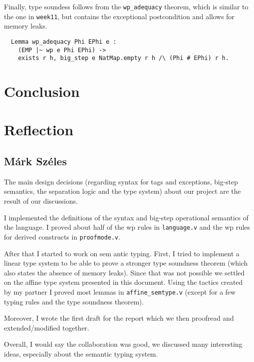 \documentclass{article}
\begin{document}
Finally, type soundess follows from the \texttt{wp\_adequacy} theorem, which is similar to the one in \texttt{week11}, but contains the exceptional postcondition and allows for memory leaks.
\begin{lstlisting}
  Lemma wp_adequacy Phi EPhi e :
    (EMP |~ wp e Phi EPhi) ->
    exists r h, big_step e NatMap.empty r h /\ (Phi # EPhi) r h.
\end{lstlisting}

\section{Conclusion}

\section{Reflection}

\subsection{Márk Széles}

The main design decisions (regarding syntax for tags and exceptions, big-step semantics, the separation logic and the type system) about our project are the result of our discussions.

I implemented the definitions of the syntax and big-step operational semantics of the language. I proved about half of the wp rules in \texttt{language.v} and the wp rules for derived constructs in \texttt{proofmode.v}.

After that I started to work on sem	antic typing. First, I tried to implement a linear type system to be able to prove a stronger type soundness theorem (which also states the absence of memory leaks). Since that was not possible we settled on the affine type system presented in this document. Using the tactics created by my partner I proved most lemmas in \texttt{affine\_semtype.v} (except for a few typing rules and the type soundness theorem). 

Moreover, I wrote the first draft for the report which we then proofread and extended/modified together.

Overall, I would say the collaboration was good, we discussed many interesting ideas, especially about the semantic typing system.
\end{document}
